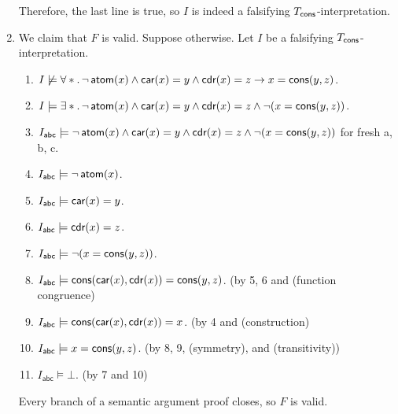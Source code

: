 \begin{exer}[3.4]
\begin{enumerate}[label=(\alph*)]
            Therefore, the last line is true, so $I$ is indeed a falsifying $T_{\operatorname{\textsf{cons}}}$-interpretation.
        \item
            We claim that $F$ is valid.
            Suppose otherwise.
            Let $I$ be a falsifying $T_{\operatorname{\textsf{cons}}}$-interpretation.
            \begin{enumerate}[label=\arabic*.]
                \item
                    $I \not\models \forall *.\, \neg\operatorname{\textsf{atom}}(x) \land \operatorname{\textsf{car}}(x) = y \land \operatorname{\textsf{cdr}}(x) = z \rightarrow x = \operatorname{\textsf{cons}}(y, z)$.
                \item
                    $I \models \exists *.\, \neg\operatorname{\textsf{atom}}(x) \land \operatorname{\textsf{car}}(x) = y \land \operatorname{\textsf{cdr}}(x) = z \land \neg(x = \operatorname{\textsf{cons}}(y, z))$.
                \item
                    $I_{\textsf{abc}} \models \neg\operatorname{\textsf{atom}}(x) \land \operatorname{\textsf{car}}(x) = y \land \operatorname{\textsf{cdr}}(x) = z \land \neg(x = \operatorname{\textsf{cons}}(y, z))$ for fresh \textsf{a}, \textsf{b}, \textsf{c}.
                \item
                    $I_{\textsf{abc}} \models \neg\operatorname{\textsf{atom}}(x)$.
                \item
                    $I_{\textsf{abc}} \models \operatorname{\textsf{car}}(x) = y$.
                \item
                    $I_{\textsf{abc}} \models \operatorname{\textsf{cdr}}(x) = z$.
                \item
                    $I_{\textsf{abc}} \models \neg(x = \operatorname{\textsf{cons}}(y, z))$.
                \item
                    $I_{\textsf{abc}} \models \operatorname{\textsf{cons}}(\operatorname{\textsf{car}}(x), \operatorname{\textsf{cdr}}(x)) = \operatorname{\textsf{cons}}(y, z)$. (by 5, 6 and (\textsf{function congruence})
                \item
                    $I_{\textsf{abc}} \models \operatorname{\textsf{cons}}(\operatorname{\textsf{car}}(x), \operatorname{\textsf{cdr}}(x)) = x$. (by 4 and (\textsf{construction})
                \item
                    $I_{\textsf{abc}} \models x = \operatorname{\textsf{cons}}(y, z)$. (by 8, 9, (\textsf{symmetry}), and (\textsf{transitivity}))
                \item
                    $I_{\textsf{abc}} \models \bot$. (by 7 and 10)
            \end{enumerate}
            Every branch of a semantic argument proof closes, so $F$ is valid.
    \end{enumerate}
\end{exer}

